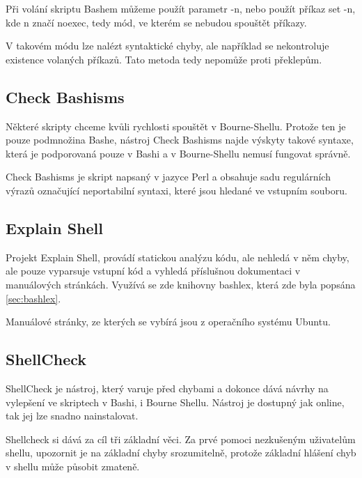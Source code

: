 \documentclass[thesis=M,czech]{FITthesis}[2012/06/26]
\begin{document}
Při volání skriptu Bashem můžeme použít parametr -n, nebo použít příkaz set -n, kde n značí noexec, tedy mód, ve kterém se nebudou spouštět příkazy.

V takovém módu lze nalézt syntaktické chyby, ale například se nekontroluje existence volaných příkazů. Tato metoda  tedy nepomůže proti překlepům.


%
%
\subsection{Check Bashisms}

Některé skripty chceme kvůli rychlosti spouštět v Bourne-Shellu. Protože ten je pouze podmnožina Bashe, nástroj Check Bashisms najde výskyty takové syntaxe, která je podporovaná pouze v Bashi a v Bourne-Shellu nemusí fungovat správně.

Check Bashisms je skript napsaný v jazyce Perl a obsahuje sadu regulárních výrazů označující neportabilní syntaxi, které jsou hledané ve vstupním souboru.



%
%
\subsection{Explain Shell}

Projekt Explain Shell, provádí statickou analýzu kódu, ale nehledá v něm chyby, ale pouze vyparsuje vstupní kód a vyhledá příslušnou dokumentaci v manuálových stránkách. Využívá se zde knihovny bashlex, která zde byla popsána \ref{sec:bashlex}.

Manuálové stránky, ze kterých se vybírá jsou z operačního systému Ubuntu.


%
%
\subsection{ShellCheck}

ShellCheck je nástroj, který varuje před chybami a dokonce dává návrhy na vylepšení ve skriptech v Bashi, i Bourne Shellu. Nástroj je dostupný jak online, tak jej lze snadno nainstalovat.

Shellcheck si dává za cíl tři základní věci. Za prvé pomoci nezkušeným uživatelům shellu, upozornit je na základní chyby srozumitelně, protože základní hlášení chyb v shellu může působit zmateně.
\end{document}
